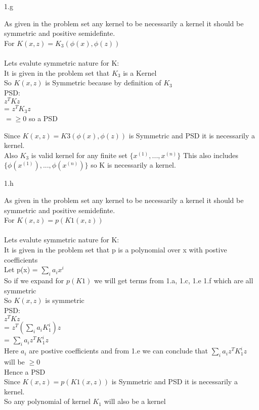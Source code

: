 \clearpage

\LARGE
1.g
\normalsize

    As given in the problem set any kernel to be necessarily a kernel it should be symmetric and positive semidefinte.\\
  For $K(x,z) =K_3(\phi(x), \phi(z))$ \\ \\
  Lets evalute symmetric nature for K: \\
  It is given in the problem set that $K_3$ is a Kernel \\
  So $K(x,z)$ is Symmetric because by definition of $K_3$ \\
  
  PSD: \\
  $z^TKz $\\ = $z^TK_3z $ \\
  $ =  \geq 0 $ so a PSD

  Since $K(x,z) =K3(\phi(x), \phi(z))$ is Symmetric and PSD it is necessarily a kernel. \\
  Also $K_3$ is valid kernel for any finite set $\{x^{(1)},...,x^{(n)}\}$ This also includes  $\{\phi(x^{(1)}),...,\phi(x^{(n)})\}$ so K is necessarily a kernel. \\

\clearpage

\LARGE
1.h
\normalsize

    As given in the problem set any kernel to be necessarily a kernel it should be symmetric and positive semidefinte.\\
  For $K(x,z) =p(K1(x,z))$ \\ \\
  Lets evalute symmetric nature for K: \\
  It is given in the problem set that p is a polynomial over x with postive coefficients \\
  Let p(x) = $ \sum_i a_ix^i $ \\
  So if we expand for $p(K1)$ we will get terms from 1.a, 1.c, 1.e 1.f which are all symmetric \\
  So $K(x,z)$ is symmetric \\
  
  PSD: \\
  $z^TKz$ \\
  = $z^T(\sum_i a_iK_1^i)z $ \\
  = $\sum_i a_iz^TK_1^i z $ \\
  Here $a_i$ are postive coefficients and from 1.e we can conclude that  $\sum_i a_iz^TK_1^i z $  will be $  \geq 0 $ \\ 
  Hence a PSD \\ 
  Since $K(x,z) =p(K1(x,z))$ is Symmetric and PSD it is necessarily a kernel. \\
  So any polynomial of kernel $K_1$ will also be a kernel

\clearpage


